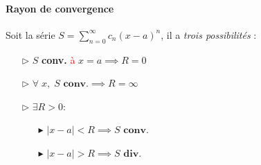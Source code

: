 \documentclass{report}
\begin{document}
\begin{multicols*}{3}
  \paragraph{Rayon de convergence}
  Soit la série $S = \sum_{n=0}^{\infty }c_n(x - a)^n$, il a 
  \textit{trois possibilités} :   
  \begin{itemize}
    \item [$\rhd$ ] $S$ \textbf{conv.} \textcolor{red}{à}   
           $x = a \implies  R = 0$  
    \item [$\rhd$ ] $\forall \; x, \; S \textbf{ conv.} \implies  
                 R = \infty$       
    \item [$\rhd$ ] $\exists R > 0 \colon $ 
        \begin{itemize}
          \item [$\blacktriangleright$ ] $|x - a| < R \implies 
            S \textbf{ conv.}  $ 
          \item [$\blacktriangleright$ ] $|x - a| > R \implies 
            S \textbf{ div.}$ 
        \end{itemize}
  \end{itemize}












     











 \end{multicols*}
\end{document}
